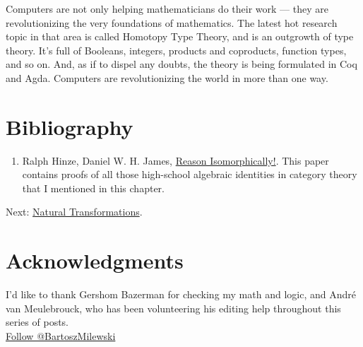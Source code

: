 Computers are not only helping mathematicians do their work --- they are
revolutionizing the very foundations of mathematics. The latest hot
research topic in that area is called Homotopy Type Theory, and is an
outgrowth of type theory. It's full of Booleans, integers, products and
coproducts, function types, and so on. And, as if to dispel any doubts,
the theory is being formulated in Coq and Agda. Computers are
revolutionizing the world in more than one way.

\section{Bibliography}\label{bibliography}

\begin{enumerate}
\tightlist
\item
  Ralph Hinze, Daniel W. H. James,
  \href{http://www.cs.ox.ac.uk/ralf.hinze/publications/WGP10.pdf}{Reason
  Isomorphically!}. This paper contains proofs of all those high-school
  algebraic identities in category theory that I mentioned in this
  chapter.
\end{enumerate}

Next:
\href{https://bartoszmilewski.com/2015/04/07/natural-transformations/}{Natural
Transformations}.

\section{Acknowledgments}\label{acknowledgments}

I'd like to thank Gershom Bazerman for checking my math and logic, and
André van Meulebrouck, who has been volunteering his editing help
throughout this series of posts.\\
\href{https://twitter.com/BartoszMilewski}{Follow @BartoszMilewski}
